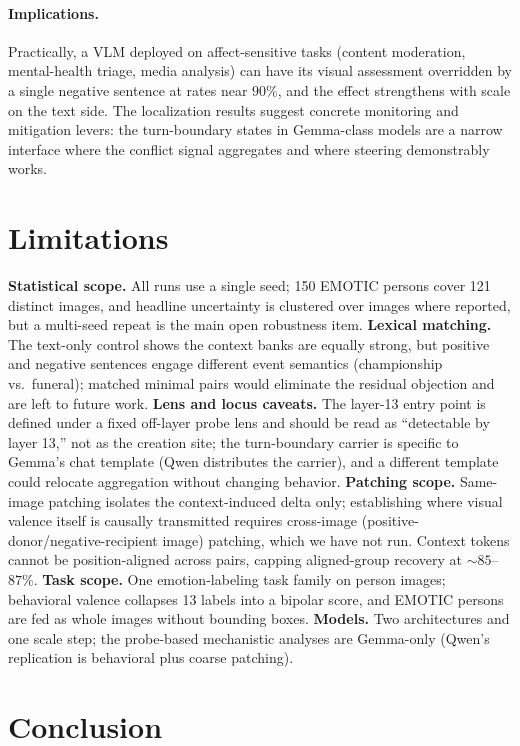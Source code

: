 \documentclass{article}
\begin{document}
\paragraph{Implications.}
Practically, a VLM deployed on affect-sensitive tasks (content moderation, mental-health triage, media analysis) can have its visual assessment overridden by a single negative sentence at rates near $90\%$, and the effect strengthens with scale on the text side. The localization results suggest concrete monitoring and mitigation levers: the turn-boundary states in Gemma-class models are a narrow interface where the conflict signal aggregates and where steering demonstrably works.

\section{Limitations}
\label{sec:limitations}

\textbf{Statistical scope.} All runs use a single seed; 150 EMOTIC persons cover 121 distinct images, and headline uncertainty is clustered over images where reported, but a multi-seed repeat is the main open robustness item. \textbf{Lexical matching.} The text-only control shows the context banks are equally strong, but positive and negative sentences engage different event semantics (championship vs.\ funeral); matched minimal pairs would eliminate the residual objection and are left to future work. \textbf{Lens and locus caveats.} The layer-13 entry point is defined under a fixed off-layer probe lens and should be read as ``detectable by layer 13,'' not as the creation site; the turn-boundary carrier is specific to Gemma's chat template (Qwen distributes the carrier), and a different template could relocate aggregation without changing behavior. \textbf{Patching scope.} Same-image patching isolates the context-induced delta only; establishing where visual valence itself is causally transmitted requires cross-image (positive-donor/negative-recipient image) patching, which we have not run. Context tokens cannot be position-aligned across pairs, capping aligned-group recovery at ${\sim}85$--$87\%$. \textbf{Task scope.} One emotion-labeling task family on person images; behavioral valence collapses 13 labels into a bipolar score, and EMOTIC persons are fed as whole images without bounding boxes. \textbf{Models.} Two architectures and one scale step; the probe-based mechanistic analyses are Gemma-only (Qwen's replication is behavioral plus coarse patching).

\section{Conclusion}
\label{sec:conclusion}
\end{document}
